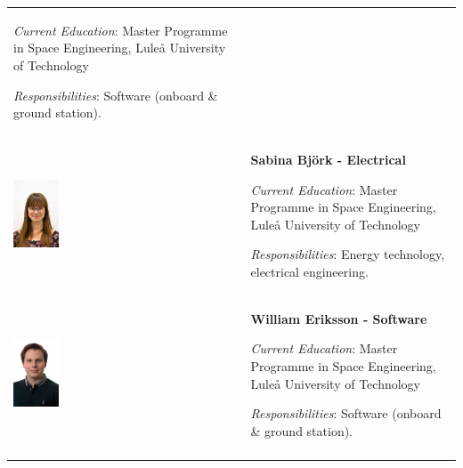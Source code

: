\begin{longtable}[]{m{} m{}}
\smallskip
\textit{Current Education}: Master Programme in Space Engineering, Luleå University of Technology

\smallskip
\textit{Responsibilities}: Software (onboard \& ground station).
\bigskip
\\

\includegraphics[width=0.2\textwidth]{0-cover/img/TEAMPICS/Sabina_final.jpg}  & \textbf{Sabina Bj\"ork - Electrical}

\smallskip
\textit{Current Education}: Master Programme in Space Engineering, Luleå University of Technology

\smallskip
\textit{Responsibilities}: Energy technology, electrical engineering.
\bigskip
\\

\includegraphics[width=0.2\textwidth]{0-cover/img/TEAMPICS/William_final.jpg}  & \textbf{William Eriksson - Software}

\smallskip
\textit{Current Education}: Master Programme in Space Engineering, Luleå University of Technology

\smallskip
\textit{Responsibilities}: Software (onboard \& ground station).
\bigskip
\\

\label{tab:people}
\end{longtable}
\raggedbottom
